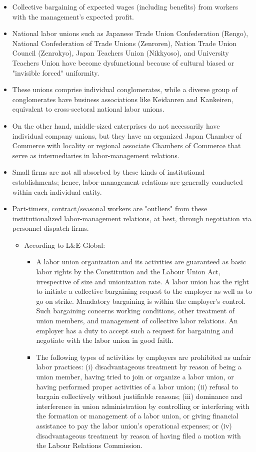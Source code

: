 \documentclass[10pt]{article}
\theoremstyle{definition}
\begin{document}
\begin{itemize}
    \item Collective bargaining of expected wages (including benefits) from workers with the management's expected profit.
    \item National labor unions such as Japanese Trade Union Confederation (Rengo), National Confederation of Trade Unions (Zenroren), Nation Trade Union Council (Zenrokyo), Japan Teachers Union (Nikkyoso), and University Teachers Union have become dysfunctional because of cultural biased or "invisible forced" uniformity.
    \item These unions comprise individual conglomerates, while a diverse group of conglomerates have business associations like Keidanren and Kankeiren, equivalent to cross-sectoral national labor unions.
    \item On the other hand, middle-sized enterprises do not necessarily have individual company unions, but they have an organized Japan Chamber of Commerce with locality or regional associate Chambers of Commerce that serve as intermediaries in labor-management relations.
    \item Small firms are not all absorbed by these kinds of institutional establishments; hence, labor-management relations are generally conducted within each individual entity.
    \item Part-timers, contract/seasonal workers are "outliers" from these institutionalized labor-management relations, at best, through negotiation via personnel dispatch firms.
    \begin{itemize}
    \item According to L\&E Global:
    \begin{itemize}
        \item A labor union organization and its activities are guaranteed as basic labor rights by the Constitution and the Labour Union Act, irrespective of size and unionization rate. A labor union has the right to initiate a collective bargaining request to the employer as well as to go on strike. Mandatory bargaining is within the employer's control. Such bargaining concerns working conditions, other treatment of union members, and management of collective labor relations. An employer has a duty to accept such a request for bargaining and negotiate with the labor union in good faith.
        \item The following types of activities by employers are prohibited as unfair labor practices: (i) disadvantageous treatment by reason of being a union member, having tried to join or organize a labor union, or having performed proper activities of a labor union; (ii) refusal to bargain collectively without justifiable reasons; (iii) dominance and interference in union administration by controlling or interfering with the formation or management of a labor union, or giving financial assistance to pay the labor union's operational expenses; or (iv) disadvantageous treatment by reason of having filed a motion with the Labour Relations Commission.

\end{itemize}
\end{itemize}
\end{itemize}
\end{document}
